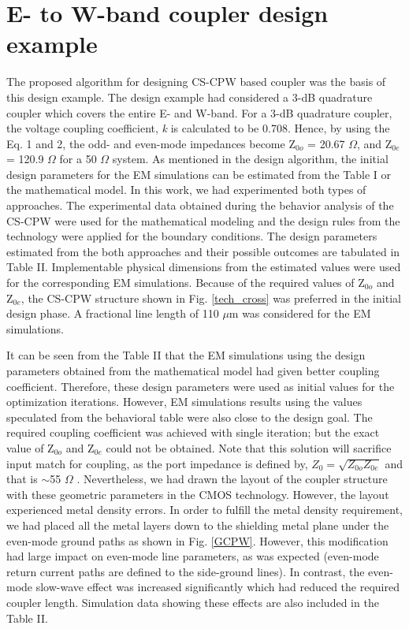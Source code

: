 \documentclass[journal]{IEEEtran}
\begin{document}
\section{E- to W-band coupler design example}
The proposed algorithm for designing CS-CPW based coupler was the basis of this design example. The design example had considered a 3-dB quadrature coupler which covers the entire E- and W-band. For a 3-dB quadrature coupler, the voltage coupling coefficient, \textit{k} is calculated to be 0.708. Hence, by using the Eq. 1 and 2, the odd- and even-mode impedances become Z$_{0o}$ = 20.67 $\Omega$, and Z$_{0e}$ = 120.9 $\Omega$ for a 50 $\Omega$ system. As mentioned in the design algorithm, the initial design parameters for the EM simulations can be estimated from the Table I or the mathematical model. In this work, we had experimented both types of approaches. The experimental data obtained during the behavior analysis of the CS-CPW were used for the mathematical modeling and the design rules from the technology were applied for the boundary conditions. The design parameters estimated from the both approaches and their possible outcomes are tabulated in Table II. Implementable physical dimensions from the estimated values were used for the corresponding EM simulations. Because of the required values of Z$_{0o}$ and Z$_{0e}$, the CS-CPW structure shown in Fig. \ref{tech_cross} was preferred in the initial design phase. A fractional line length of 110 $\mu$m was considered for the EM simulations.

It can be seen from the Table II that the EM simulations using the design parameters obtained from the mathematical model had given better coupling coefficient. Therefore, these design parameters were used as initial values for the optimization iterations. However, EM simulations results using the values speculated from the behavioral table were also close to the design goal. The required coupling coefficient was achieved with single iteration; but the exact value of Z$_{0o}$ and Z$_{0e}$ could not be obtained. Note that this solution will sacrifice input match for coupling, as the port impedance is defined by,  $Z_{0} = \sqrt{Z_{0o}Z_{0e}}$ and that is $\sim$55 $\Omega$ . Nevertheless, we had drawn the layout of the coupler structure with these geometric parameters in the CMOS technology. However, the layout experienced metal density errors. In order to fulfill the metal density requirement, we had placed all the metal layers down to the shielding metal plane under the even-mode ground paths as shown in Fig. \ref{GCPW}. However, this modification had large impact on even-mode line parameters, as was expected (even-mode return current paths are defined to the side-ground lines). In contrast, the even-mode slow-wave effect was increased significantly which had reduced the required coupler length. Simulation data showing these effects are also included in the Table II.
\end{document}

